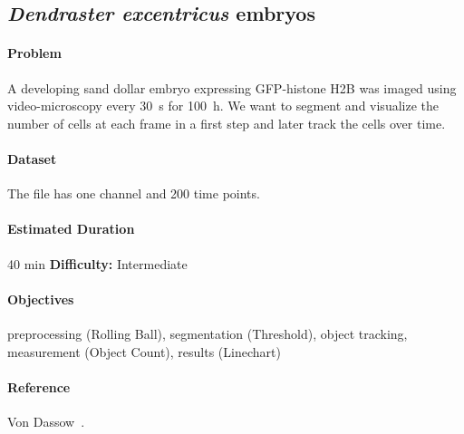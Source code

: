 \subsection{\textit{Dendraster excentricus} embryos} \label{sec:dendraster-excentricus}

\paragraph{Problem}
A developing sand dollar embryo expressing GFP-histone H2B was imaged using video-microscopy every \SI{30}{\second} for \SI{100}{\hour}. We want to segment and visualize the number of cells at each frame in a first step and later track the cells over time.

\paragraph{Dataset} The file  has one channel and 200 time points.

\paragraph{Estimated Duration} 40 min \quad \textbf{Difficulty:} Intermediate

\paragraph{Objectives} 
preprocessing (Rolling Ball), 
segmentation (Threshold), 
object tracking, 
measurement (Object Count), 
results (Linechart)

\paragraph{Reference} 
Von Dassow~\cite{vondassow2011}.



